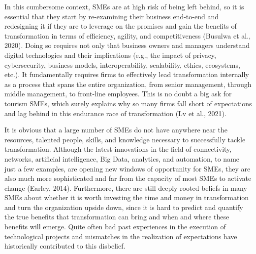 \documentclass[
  letterpaper,
  DIV=11,
  numbers=noendperiod]{scrreprt}
\begin{document}
In this cumbersome context, SMEs are at high risk of being left behind,
so it is essential that they start by re-examining their business
end-to-end and redesigning it if they are to leverage on the promises
and gain the benefits of transformation in terms of efficiency, agility,
and competitiveness (Busulwa et al., 2020). Doing so requires not only
that business owners and managers understand digital technologies and
their implications (e.g., the impact of privacy, cybersecurity, business
models, interoperability, scalability, ethics, ecosystems, etc.). It
fundamentally requires firms to effectively lead transformation
internally as a process that spans the entire organization, from senior
management, through middle management, to front-line employees. This is
no doubt a big ask for tourism SMEs, which surely explains why so many
firms fall short of expectations and lag behind in this endurance race
of transformation (Lv et al., 2021).

It is obvious that a large number of SMEs do not have anywhere near the
resources, talented people, skills, and knowledge necessary to
successfully tackle transformation. Although the latest innovations in
the field of connectivity, networks, artificial intelligence, Big Data,
analytics, and automation, to name just a few examples, are opening new
windows of opportunity for SMEs, they are also much more sophisticated
and far from the capacity of most SMEs to activate change (Earley,
2014). Furthermore, there are still deeply rooted beliefs in many SMEs
about whether it is worth investing the time and money in transformation
and turn the organization upside down, since it is hard to predict and
quantify the true benefits that transformation can bring and when and
where these benefits will emerge. Quite often bad past experiences in
the execution of technological projects and mismatches in the
realization of expectations have historically contributed to this
disbelief.
\end{document}
